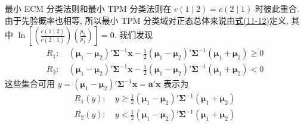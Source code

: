 最小 ECM 分类法则和最小 TPM 分类法则在 $c(1\mid2)=c(2\mid1)$ 时彼此重合. 由于先验概率也相等, 所以最小 TPM 分类域对正态总体来说由\hyperref[eq:11-12]{式(11-12)}定义, 其中 $\ln\left[\left(\frac{c(1\mid2)}{c(2\mid1)}\right)\left(\frac{p_2}{p_1}\right)\right]=0$. 我们发现
\[
\begin{aligned}
R_1:\ &(\boldsymbol{\mu}_1-\boldsymbol{\mu}_2)'\boldsymbol{\Sigma}^{-1}\mathbf{x}-\frac{1}{2}(\boldsymbol{\mu}_1-\boldsymbol{\mu}_2)'\boldsymbol{\Sigma}^{-1}(\boldsymbol{\mu}_1+\boldsymbol{\mu}_2)\geqslant0\\
R_2:\ &(\boldsymbol{\mu}_1-\boldsymbol{\mu}_2)'\boldsymbol{\Sigma}^{-1}\mathbf{x}-\frac{1}{2}(\boldsymbol{\mu}_1-\boldsymbol{\mu}_2)'\boldsymbol{\Sigma}^{-1}(\boldsymbol{\mu}_1+\boldsymbol{\mu}_2)<0
\end{aligned}
\]
这些集合可用 $y=(\boldsymbol{\mu}_1-\boldsymbol{\mu}_2)'\boldsymbol{\Sigma}^{-1}\mathbf{x}=\mathbf{a}'\mathbf{x}$ 表示为
\[
\begin{aligned}
R_1(y):\ &y\geqslant\frac{1}{2}(\boldsymbol{\mu}_1-\boldsymbol{\mu}_2)'\boldsymbol{\Sigma}^{-1}(\boldsymbol{\mu}_1+\boldsymbol{\mu}_2)\\
R_2(y):\ &y<\frac{1}{2}(\boldsymbol{\mu}_1-\boldsymbol{\mu}_2)'\boldsymbol{\Sigma}^{-1}(\boldsymbol{\mu}_1+\boldsymbol{\mu}_2)
\end{aligned}
\]
